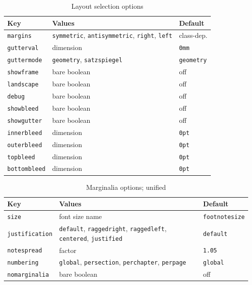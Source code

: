\documentclass[11pt, twoside, openany]{book}
\begin{document}
\begin{table}[h]
	\caption{Layout selection options}
	\label{tab:layoutselection}
	\centering
	\begin{tabular}{lll}
		\textbf{Key}       & \textbf{Values} & \textbf{Default} \\
		\hline
		\texttt{margins}       & \texttt{symmetric}, \texttt{antisymmetric},
		\texttt{right}, \texttt{left} & class-dep. \\
		\texttt{gutterval} & dimension       & \texttt{0mm}     \\
		\texttt{guttermode}    & \texttt{geometry}, \texttt{satzspiegel}
		& \texttt{geometry} \\
		\texttt{showframe} & bare boolean    & off              \\
		\texttt{landscape} & bare boolean    & off              \\
		\texttt{debug}     & bare boolean    & off              \\
        \texttt{showbleed}  & bare boolean    & off              \\
		\texttt{showgutter} & bare boolean    & off              \\
		\texttt{innerbleed} & dimension       & \texttt{0pt}     \\
		\texttt{outerbleed} & dimension       & \texttt{0pt}     \\
		\texttt{topbleed}   & dimension       & \texttt{0pt}     \\
		\texttt{bottombleed}& dimension       & \texttt{0pt}     \\

	\end{tabular}
\end{table}




\begin{table}[h]
	\caption{Marginalia options; unified}
	\label{tab:marginaliaunifiedselection}
	\centering
	\begin{tabular}{lll}
		\textbf{Key}          & \textbf{Values} & \textbf{Default}      \\
		\hline
		\texttt{size}         & font size name  & \texttt{footnotesize} \\
		\texttt{justification} & \texttt{default}, \texttt{raggedright},
		\texttt{raggedleft}, \texttt{centered}, \texttt{justified}
		& \texttt{default} \\
		\texttt{notespread}   & factor          & \texttt{1.05}         \\
		\texttt{numbering}     & \texttt{global}, \texttt{persection},
		\texttt{perchapter}, \texttt{perpage}
		& \texttt{global} \\
		\texttt{nomarginalia} & bare boolean    & off                   \\
	\end{tabular}
\end{table}
\end{document}
